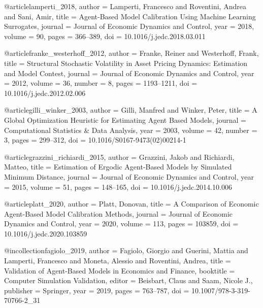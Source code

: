 
@article{lamperti_2018,
  author  = {Lamperti, Francesco and Roventini, Andrea and Sani, Amir},
  title   = {Agent-Based Model Calibration Using Machine Learning Surrogates},
  journal = {Journal of Economic Dynamics and Control},
  year    = {2018}, volume = {90}, pages = {366--389},
  doi     = {10.1016/j.jedc.2018.03.011}
}


@article{franke_westerhoff_2012,
  author  = {Franke, Reiner and Westerhoff, Frank},
  title   = {Structural Stochastic Volatility in Asset Pricing Dynamics: Estimation and Model Contest},
  journal = {Journal of Economic Dynamics and Control},
  year    = {2012}, volume = {36}, number = {8}, pages = {1193--1211},
  doi     = {10.1016/j.jedc.2012.02.006}
}


@article{gilli_winker_2003,
  author  = {Gilli, Manfred and Winker, Peter},
  title   = {A Global Optimization Heuristic for Estimating Agent Based Models},
  journal = {Computational Statistics \& Data Analysis},
  year    = {2003}, volume = {42}, number = {3}, pages = {299--312},
  doi     = {10.1016/S0167-9473(02)00214-1}
}


@article{grazzini_richiardi_2015,
  author  = {Grazzini, Jakob and Richiardi, Matteo},
  title   = {Estimation of Ergodic Agent-Based Models by Simulated Minimum Distance},
  journal = {Journal of Economic Dynamics and Control},
  year    = {2015}, volume = {51}, pages = {148--165},
  doi     = {10.1016/j.jedc.2014.10.006}
}


@article{platt_2020,
  author  = {Platt, Donovan},
  title   = {A Comparison of Economic Agent-Based Model Calibration Methods},
  journal = {Journal of Economic Dynamics and Control},
  year    = {2020}, volume = {113}, pages = {103859},
  doi     = {10.1016/j.jedc.2020.103859}
}


@incollection{fagiolo_2019,
  author    = {Fagiolo, Giorgio and Guerini, Mattia and Lamperti, Francesco and Moneta, Alessio and Roventini, Andrea},
  title     = {Validation of Agent-Based Models in Economics and Finance},
  booktitle = {Computer Simulation Validation},
  editor    = {Beisbart, Claus and Saam, Nicole J.},
  publisher = {Springer}, year = {2019}, pages = {763--787},
  doi     = {10.1007/978-3-319-70766-2_31}
}


